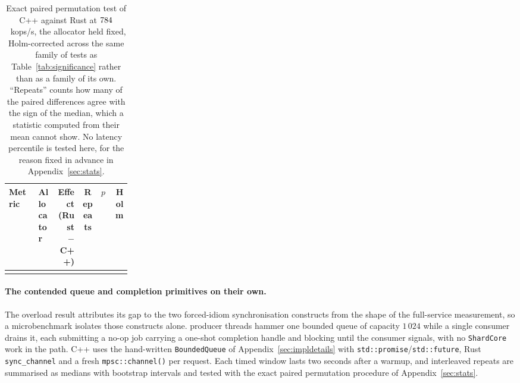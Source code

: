 \documentclass[english,oneside,a4paper,censored,csm,software-track-2020]{HYthesisML}
\begin{document}
\begin{table}[H]
\centering
\small
\caption[Exact paired test past saturation]{Exact paired permutation test of C++ against Rust at
$784$~kops/s, the allocator held fixed, Holm-corrected across the same family of
\NTests{} tests as Table~\ref{tab:significance} rather than as a family of its own. ``Repeats''
counts how many of the \NRepeats{} paired differences agree with the sign of the median, which a
statistic computed from their mean cannot show. No latency percentile is tested here, for the
reason fixed in advance in Appendix~\ref{sec:stats}.\label{tab:overloadtest}}
\setlength{\tabcolsep}{4pt}
\begin{tabular}{@{}p{0.24\linewidth} l r c r r@{}}
\hline\hline
Metric & Allocator & Effect (Rust $-$ C++) & Repeats & $p$ & Holm \\
\hline
\\
\hline
\end{tabular}
\end{table}

\paragraph{The contended queue and completion primitives on their own.}\label{sec:contention}
The overload result attributes its gap to the two forced-idiom synchronisation constructs from the
shape of the full-service measurement, so a microbenchmark isolates those constructs alone.
\ContentionProducers{} producer threads hammer one bounded queue of capacity $1\,024$ while a
single consumer drains it, each submitting a no-op job carrying a one-shot completion handle and
blocking until the consumer signals, with no \texttt{ShardCore} work in the path. C++ uses the
hand-written \texttt{BoundedQueue} of Appendix~\ref{sec:impldetails} with
\texttt{std::promise}/\texttt{std::future}, Rust \texttt{sync\_channel} and a fresh
\texttt{mpsc::channel()} per request. Each timed window lasts two seconds after a warmup, and
\ContentionRepeats{} interleaved repeats are summarised as medians with bootstrap intervals and
tested with the exact paired permutation procedure of Appendix~\ref{sec:stats}.
\end{document}
